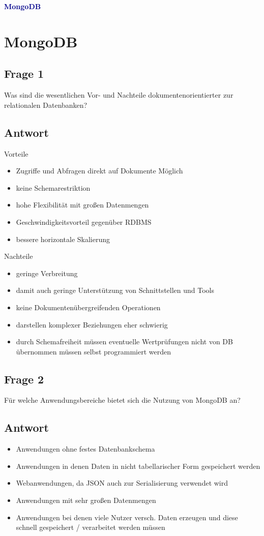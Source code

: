 \textbf{\textcolor{darkblue}{ MongoDB}}~

\section*{MongoDB}
\subsection*{Frage 1}
Was sind die wesentlichen Vor- und Nachteile dokumentenorientierter zur relationalen Datenbanken?
\subsection*{Antwort}
Vorteile
\begin{itemize}
	\item Zugriffe und Abfragen direkt auf Dokumente Möglich
	\item keine Schemarestriktion
	\item hohe Flexibilität mit großen Datenmengen
	\item Geschwindigkeitsvorteil gegenüber RDBMS
	\item bessere horizontale Skalierung
\end{itemize}
Nachteile
\begin{itemize}
	\item geringe Verbreitung
 	\item damit auch geringe Unterstützung von Schnittstellen und Tools
 	\item keine Dokumentenübergreifenden Operationen 
 	\item darstellen komplexer Beziehungen eher schwierig
 	\item durch Schemafreiheit müssen eventuelle Wertprüfungen nicht von DB  
 	  übernommen müssen selbst programmiert werden
\end{itemize}
\subsection*{Frage 2}
Für welche Anwendungsbereiche bietet sich die Nutzung von MongoDB an?
\subsection*{Antwort}
\begin{itemize}
	\item Anwendungen ohne festes Datenbankschema
	\item Anwendungen in denen Daten in nicht tabellarischer Form gespeichert werden
	\item Webanwendungen, da JSON auch zur Serialisierung verwendet wird
	\item Anwendungen mit sehr großen Datenmengen
	\item Anwendungen bei denen viele Nutzer versch. Daten erzeugen und diese schnell gespeichert / verarbeitet werden müssen
\end{itemize}

